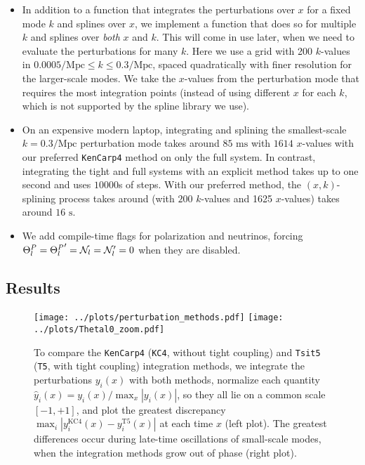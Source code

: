 \documentclass[10pt,a4paper]{article}
\begin{document}
\begin{itemize}
\item
In addition to a function that integrates the perturbations over $x$ for a fixed mode $k$ and splines over $x$,
we implement a function that does so for multiple $k$ and splines over \emph{both} $x$ and $k$.
This will come in use later, when we need to evaluate the perturbations for many $k$.
Here we use a grid with 200 $k$-values in $0.0005 / \textrm{Mpc} \leq k \leq 0.3 / \textrm{Mpc}$, spaced quadratically with finer resolution for the larger-scale modes.
We take the $x$-values from the perturbation mode that requires the most integration points (instead of using different $x$ for each $k$, which is not supported by the spline library we use).

\item
On an expensive modern laptop,
integrating and splining the smallest-scale $k=0.3/\textrm{Mpc}$ perturbation mode
takes around $85 \textrm{ ms}$ with $1614$ $x$-values with our preferred \texttt{KenCarp4} method on only the full system.
In contrast, integrating the tight and full systems with an explicit method takes up to one second and uses $10000$s of steps.
With our preferred method, the $(x,k)$-splining process takes around (with $200$ $k$-values and 1625 $x$-values) takes around $16 \textrm{ s}$.

\item
We add compile-time flags for polarization and neutrinos,
forcing $\Theta^P_l = {\Theta^P_l}^\prime = \mathcal{N}_l = \mathcal{N}_l^\prime = 0$ when they are disabled.
\end{itemize}

\subsection{Results}

\begin{figure}
\texttt{[image: ../plots/perturbation\_methods.pdf]}
\hfill
\texttt{[image: ../plots/Thetal0\_zoom.pdf]}
\caption{To compare the \texttt{KenCarp4} (\texttt{KC4}, without tight coupling) and \texttt{Tsit5} (\texttt{T5}, with tight coupling) integration methods,
we integrate the perturbations $y_i(x)$ with both methods,
normalize each quantity $\hat{y}_i(x) = y_i(x) / \max_x |y_i(x)|$, so they all lie on a common scale $[-1, +1]$,
and plot the greatest discrepancy $\max_i |y^\text{KC4}_i(x) - y^\text{T5}_i(x)|$ at each time $x$ (left plot).
The greatest differences occur during late-time oscillations of small-scale modes, when the integration methods grow out of phase (right plot).}
\label{fig_perturb_methods}
\end{figure}
\end{document}
